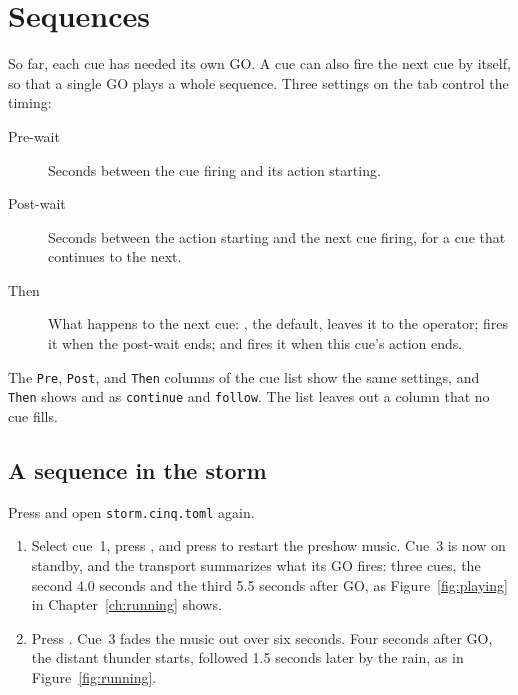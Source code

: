 %

\chapter{Sequences}
\label{ch:sequences}

So far, each cue has needed its own GO\@.  A cue can also fire the next cue
by itself, so that a single GO plays a whole sequence.  Three settings on the
 tab control the timing:

\begin{description}
\item[Pre-wait] Seconds between the cue firing and its action starting.
\item[Post-wait] Seconds between the action starting and the next cue
  firing, for a cue that continues to the next.
\item[Then] What happens to the next cue: , the default,
  leaves it to the operator;  fires it when the post-wait
  ends; and  fires it when this cue's action ends.
\end{description}

The \texttt{Pre}, \texttt{Post}, and \texttt{Then} columns of the cue list
show the same settings, and \texttt{Then} shows  and
 as \texttt{continue} and \texttt{follow}.  The list leaves
out a column that no cue fills.

\section{A sequence in the storm}

Press  and open \texttt{storm.cinq.toml} again.

\begin{enumerate}
\item Select cue~1, press , and press  to restart
  the preshow music.  Cue~3 is now on standby, and the transport summarizes
  what its GO fires: three cues, the second 4.0 seconds and the third 5.5
  seconds after GO, as Figure~\ref{fig:playing} in
  Chapter~\ref{ch:running} shows.
\item Press \@.  Cue~3 fades the music out over six seconds.  Four
  seconds after GO, the distant thunder starts, followed 1.5 seconds later by
  the rain, as in Figure~\ref{fig:running}.
\end{enumerate}

